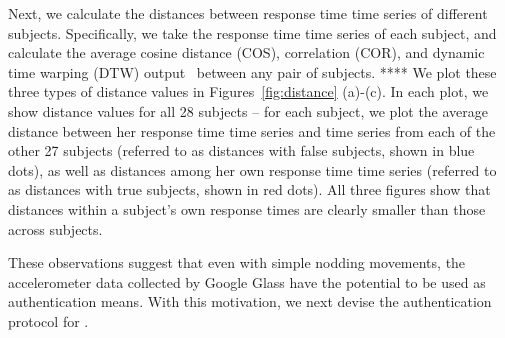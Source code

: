 Next, we calculate the distances between response time time series of different subjects. Specifically, we take the response time time series of each subject, and calculate the average cosine distance (COS), correlation (COR), and dynamic time warping (DTW) output~\cite{dtw} between any pair of subjects. **** We plot these three types of distance values in Figures~\ref{fig:distance} (a)-(c). In each plot, we show distance values for all 28 subjects -- for each subject, we plot the average distance between her response time time series and time series from each of the other 27 subjects (referred to as distances with false subjects, shown in blue dots), as well as distances among her own response time time series (referred to as distances with true subjects, shown in red dots). All three figures show that distances within a subject's own response times are clearly smaller than those across subjects.

These observations suggest that even with simple nodding movements, the accelerometer data collected by Google Glass have the potential to be used as authentication means. With this motivation, we next devise the authentication protocol for \systemname.
